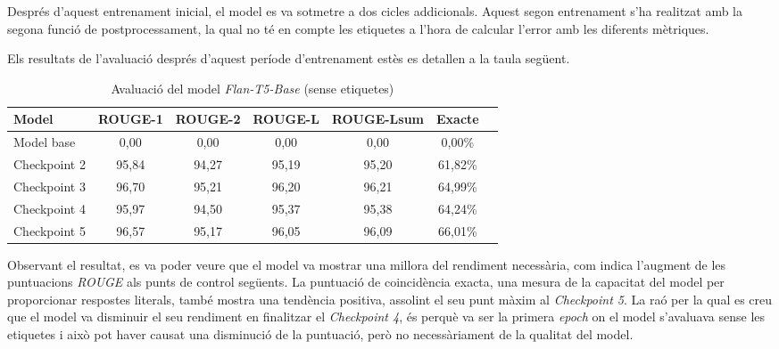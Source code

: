 Després d'aquest entrenament inicial, el model es va sotmetre a dos cicles addicionals. Aquest segon entrenament s'ha realitzat amb la segona funció de postprocessament, la qual no té en compte les etiquetes a l'hora de calcular l'error amb les diferents mètriques.

Els resultats de l'avaluació després d'aquest període d'entrenament estès es detallen a la taula següent.

\begin{table}[H]
    \centering
    \begin{tabular}{lcccccc}
    \toprule
    Model & ROUGE-1 & ROUGE-2 & ROUGE-L & ROUGE-Lsum & Exacte \\
    \midrule
    Model base   & 0,00  & 0,00  & 0,00  & 0,00  & 0,00\% \\
    Checkpoint 2 & 95,84 & 94,27 & 95,19 & 95,20 & 61,82\% \\
    Checkpoint 3 & 96,70 & 95,21 & 96,20 & 96,21 & 64,99\% \\
    Checkpoint 4 & 95,97 & 94,50 & 95,37 & 95,38 & 64,24\% \\
    Checkpoint 5 & 96,57 & 95,17 & 96,05 & 96,09 & 66,01\% \\
    \bottomrule
    \end{tabular}
    \caption[Avaluació del model \textit{Flan-T5-Base}]{Avaluació del model \textit{Flan-T5-Base} (sense etiquetes)}
\end{table}

Observant el resultat, es va poder veure que el model va mostrar una millora del rendiment necessària, com indica l'augment de les puntuacions \textit{ROUGE} als punts de control següents. La puntuació de coincidència exacta, una mesura de la capacitat del model per proporcionar respostes literals, també mostra una tendència positiva, assolint el seu punt màxim al \textit{Checkpoint 5}. La raó per la qual es creu que el model va disminuir el seu rendiment en finalitzar el \textit{Checkpoint 4}, és perquè va ser la primera \textit{epoch} on el model s'avaluava sense les etiquetes i això pot haver causat una disminució de la puntuació, però no necessàriament de la qualitat del model.





